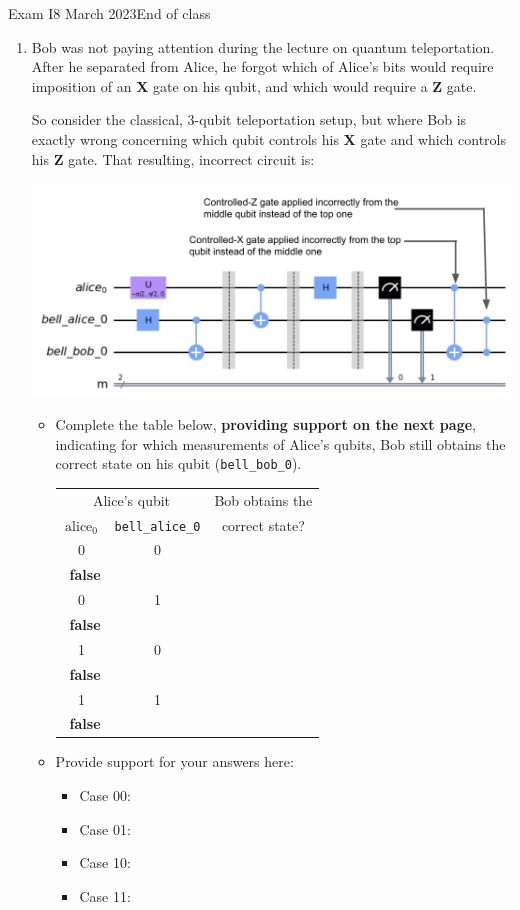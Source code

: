\documentclass[12pt]{article}
\def\Gate#1{\mbox{\textbf{#1}}}
\def\X{\Gate{X}}
\def\Z{\Gate{Z}}
\def\Obox#1{\Ovalbox{\hbox to 1ex{\vrule width 0pt height 1ex\hss #1\hss}}}
\def\TFMarked#1#2{\ \stackbox[l][m]{\Obox{#1}~\textbf{true}\\\Obox{#2}~\textbf{false}}}
\def\TF{\TFMarked{\relax}{\relax}}
\begin{document}
\begin{assignment}{Exam I}{8 March 2023}{End of class}
\begin{enumerate}
\clearpage\item{}
Bob was not paying attention during the lecture on quantum teleportation.  After he separated from Alice, he forgot which of Alice's bits would require imposition of an \X{} gate on his qubit, and which would require a \Z{} gate.

So consider the classical, 3-qubit teleportation setup, but where Bob is exactly wrong concerning which qubit controls his \X{} gate and which controls his \Z{} gate.  That resulting, incorrect circuit is:

\includegraphics[scale=0.25]{tportwrong.png}

\begin{itemize}
    \item{}
Complete the table below, \textbf{providing support on the next page}, indicating for which measurements of Alice's qubits, Bob still obtains the correct state on his qubit (\texttt{bell\_bob\_0}).
\begin{center}\Large
\begin{tabular}{ccc}
\multicolumn{2}{c}{Alice's qubit} & Bob obtains the  \\
\texttt{$\mbox{alice}_0$} & \texttt{bell\_alice\_0} & correct state?\\[1em]
0 & 0 & \TF \\[2em]
0 & 1 & \TF \\[2em] 
1 & 0 & \TF \\[2em]
1 & 1 & \TF \\
\end{tabular}
\end{center}
\Continued{}
\item {} Provide support for your answers here:
\begin{itemize}
    \item {} Case 00:
    \LeaveSpace{1.5in}
   \item {} Case 01:
    \LeaveSpace{1.5in}
       \item {} Case 10:
    \LeaveSpace{1.5in}
       \item {} Case 11:
    \LeaveSpace{1.5in}
\end{itemize}
\end{itemize}

\end{enumerate}

\end{assignment}
\Bpage{}
\end{document}
